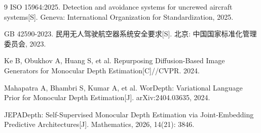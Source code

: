 \documentclass[12pt,a4paper]{ctexart}
\begin{document}
\begin{thebibliography}{9}
 ISO 15964:2025. Detection and avoidance systems for uncrewed aircraft systems[S]. Geneva: International Organization for Standardization, 2025.

 GB 42590-2023. 民用无人驾驶航空器系统安全要求[S]. 北京: 中国国家标准化管理委员会, 2023.

 Ke B, Obukhov A, Huang S, et al. Repurposing Diffusion-Based Image Generators for Monocular Depth Estimation[C]//CVPR. 2024.

 Mahapatra A, Bhambri S, Kumar A, et al. WorDepth: Variational Language Prior for Monocular Depth Estimation[J]. arXiv:2404.03635, 2024.

 JEPADepth: Self-Supervised Monocular Depth Estimation via Joint-Embedding Predictive Architectures[J]. Mathematics, 2026, 14(21): 3846.

\end{thebibliography}
\end{document}
